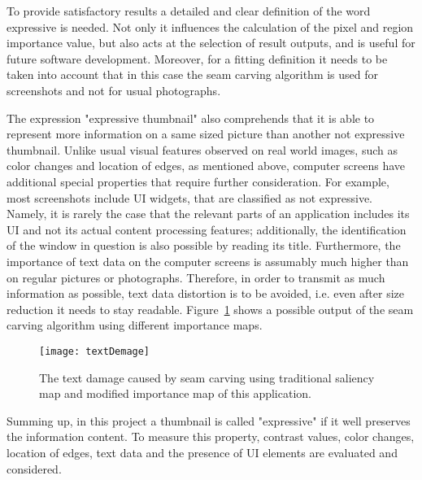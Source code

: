 \documentclass[draft,final]{vutinfth} %
\begin{document}
	To provide satisfactory results a detailed and clear definition of the word expressive is needed.
	Not only it influences the calculation of the pixel and region importance value, but also acts at the selection of result outputs, and is useful for future software development.
	Moreover, for a fitting definition it needs to be taken into account that in this case the seam carving algorithm is used for screenshots and not for usual photographs.\par 
	The expression "expressive thumbnail" also comprehends that it is able to represent more information on a same sized picture than another not expressive thumbnail.
	Unlike usual visual features observed on real world images, such as color changes and location of edges, as mentioned above, computer screens have additional special properties that require further consideration.
	For example, most screenshots include UI widgets, that are classified as not expressive.
	Namely, it is rarely the case that the relevant parts of an application includes its UI and not its actual content processing features; additionally, the identification of the window in question is also possible by reading its title.
	Furthermore, the importance of text data on the computer screens is assumably much higher than on regular pictures or photographs. 
	Therefore, in order to transmit as much information as possible, text data distortion is to be avoided, i.e. even after size reduction it needs to stay readable.
	Figure~\ref{fig:textDamage} shows a possible output of the seam carving algorithm using different importance maps.\par 
	\begin{figure}[H]
		\centering		
		\texttt{[image: textDemage]}
		\caption{The text damage caused by seam carving using traditional saliency map and modified importance map of this application. }
		\label{fig:textDamage}
	\end{figure} 
	Summing up, in this project a thumbnail is called "expressive" if it well preserves the information content.
	To measure this property, contrast values, color changes, location of edges, text data and the presence of UI elements are evaluated and considered. 
	
	
\end{document}
